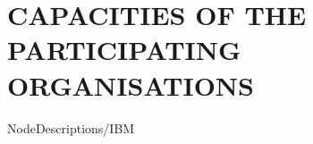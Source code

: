 \documentclass[11pt,a4paper]{article}
\begin{document}
%
%
\section*{CAPACITIES OF THE PARTICIPATING ORGANISATIONS}
\label{sec:capacities}
 {NodeDescriptions/IBM}
\end{document}
